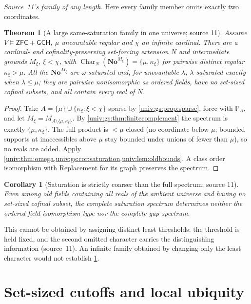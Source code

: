 \documentclass[11pt,letterpaper]{article}
\numberwithin{equation}{section}
\newtheorem{theorem}{Theorem}[section]
\newtheorem{corollary}[corollary]{Corollary}
\theoremstyle{definition}
\theoremstyle{remark}
\newcommand{\No}{\mathbf{No}}
\newcommand{\ZFC}{\mathsf{ZFC}}
\newcommand{\Char}{\operatorname{Char}}
\newcommand{\GCH}{\mathsf{GCH}}
\begin{document}
\emph{Source~11's family of any length.} Here every family member omits exactly two
coordinates.

\begin{theorem}[A large same-saturation family in one universe; source 11]\label{univ:gs:thm:samesat}
Assume $V\models\ZFC+\GCH$, $\mu$ uncountable regular and $\chi$ an infinite cardinal. There
are a cardinal- and cofinality-preserving set-forcing extension $N$ and intermediate grounds
$M_\xi$, $\xi<\chi$, with $\Char_N(\No^{M_\xi})=\{\mu,\kappa_\xi\}$ for pairwise distinct
regular $\kappa_\xi>\mu$. All the $\No^{M_\xi}$ are $\omega$-saturated and, for uncountable
$\lambda$, $\lambda$-saturated exactly when $\lambda\le\mu$; they are pairwise nonisomorphic as
ordered fields, have no set-sized cofinal subsets, and all contain every real of $N$.
\end{theorem}
\begin{proof}
Take $A=\{\mu\}\cup\{\kappa_\xi:\xi<\chi\}$ sparse by \cref{univ:gs:prop:sparse}, force with
$\mathbb P_A$, and let $M_\xi=M_{A\setminus\{\mu,\kappa_\xi\}}$. By
\cref{univ:gs:thm:finitecomplement} the spectrum is exactly $\{\mu,\kappa_\xi\}$. The full
product is $<\mu$-closed (no coordinate below $\mu$; bounded supports at inaccessibles above
$\mu$ stay bounded under unions of fewer than $\mu$), so no reals are added. Apply
\cref{univ:thm:omega,univ:gs:cor:saturation,univ:lem:oldbounds}. A class order isomorphism
with Replacement for its graph preserves the spectrum.
\end{proof}

\begin{corollary}[Saturation is strictly coarser than the full spectrum; source 11]\label{univ:gs:cor:coarser}
Even among old fields containing all reals of the ambient universe and having no set-sized
cofinal subset, the complete saturation spectrum determines neither the ordered-field
isomorphism type nor the complete gap spectrum.
\end{corollary}

This cannot be obtained by assigning distinct least thresholds: the threshold is held fixed,
and the second omitted character carries the distinguishing information (source~11). An
infinite family obtained by changing only the least character would not establish
\cref{univ:gs:thm:samesat}.

\section{Set-sized cutoffs and local ubiquity}\label{univ:gs:sec:cutoff}
\end{document}

